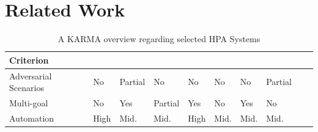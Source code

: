 \documentclass[conference]{IEEEtran}
\begin{document}

\section{Related Work}
\label{sec:related_work}

\begin{table}[h!]
    \centering
    \caption{A KARMA overview regarding selected HPA Systems}
    \label{tab:autoscaling_criteria}
    {\footnotesize
        \renewcommand{\arraystretch}{1.1}
        \begin{tabular}{>{\raggedright\arraybackslash}m{1.3cm}>{\centering\arraybackslash}m{0.6cm}>{\centering\arraybackslash}m{0.6cm}>{\centering\arraybackslash}m{0.6cm}>{\centering\arraybackslash}m{0.6cm}>{\centering\arraybackslash}m{0.6cm}>{\centering\arraybackslash}m{0.6cm}>{\centering\arraybackslash}m{0.6cm}>{\centering\arraybackslash}m{0.6cm}>{\centering\arraybackslash}m{0.6cm}}
            \hline
            \textbf{Criterion}    & \vspace{-0.3cm}\textbf{\cite{gymhpa2022}} & \vspace{-0.3cm}\textbf{\cite{aware2023}} & \vspace{-0.3cm}\textbf{\cite{Rossi2019}} & \vspace{-0.3cm}\textbf{\cite{QoSRL}} & \vspace{-0.3cm}\textbf{\cite{Zhou2024}} & \vspace{-0.3cm}\textbf{\cite{KOSMOS}} & \vspace{-0.3cm}\textbf{\cite{COPA}} \\
            \hline
            \hline
            Adversarial Scenarios & No                                        & Partial                                  & No                                       & No                                   & No                                      & No                                    & Partial                             \\
            \hline
            Multi-goal            & No                                        & Yes                                      & Partial                                  & Yes                                  & No                                      & Yes                                   & No                                  \\
            \hline
            Automation            & High                                      & Mid.                                     & Mid.                                     & High                                 & Mid.                                    & Mid.                                  & Mid.                                \\

\end{tabular}}
\end{table}
\end{document}
